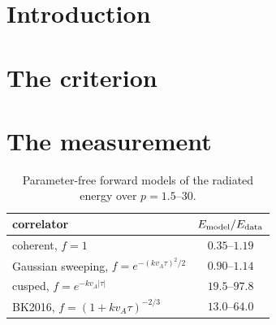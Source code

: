 \documentclass[prd,twocolumn,aps,nobibnotes,superscriptaddress,preprintnumbers,floatfix]{revtex4-1}
\begin{document}
\section{Introduction}

\section{The criterion}

\section{The measurement}
\label{sec:letter-measurement}
\begin{table}[b]
  \centering
  \begin{tabular}{@{}lc@{}}
  \hline\hline
  correlator & $E_{\rm model}/E_{\rm data}$ \\
  \hline
  coherent, $f=1$ & $0.35$--$1.19$ \\
  Gaussian sweeping, $f=e^{-(kv_A\tau)^2/2}$ & $0.90$--$1.14$ \\
  cusped, $f=e^{-kv_A|\tau|}$ & $19.5$--$97.8$ \\
  BK2016, $f=(1+kv_A\tau)^{-2/3}$ & $13.0$--$64.0$ \\
  \hline\hline
  \end{tabular}
  \caption{Parameter-free forward models of the radiated energy over $p=1.5$--$30$.}
  \label{tab:letter-uetc}
\end{table}
\end{document}

